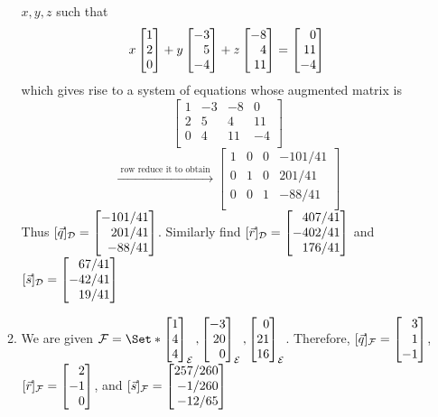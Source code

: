 \begin{exercises}
\begin{problist}
\begin{solution}
\begin{enumerate}
\begin{enumerate}
							$x, y, z$ such that \[ x \mat{1\\2\\0} + y \mat{-3\\5\\-4} +z 
							\mat{-8\\4\\11} = \mat{0\\11\\-4}\] which 
							gives rise to a system of equations whose augmented matrix is 
							\[
							\left[
							\begin{array}{ccc|c}
								1 & -3 & -8 & 0  \\
								2 & 5 & 4 & 11 \\
								0 & 4 & 11 & -4 \\
							\end{array}
							\right]\]\[ \xrightarrow{\text{ row reduce it to obtain }}
							\left[
							\begin{array}{ccc|c}
								1 & 0 & 0 & -101/41  \\
								0 & 1 & 0 & 201/41 \\
								0 & 0 & 1 & -88/41\\
							\end{array}
							\right]
							\]
							Thus $[\vec{q}]_{\mathcal{D}} = \mat{-101/41 \\ 201/41 \\ -88/41}$. Similarly find 
							$[\vec{r}]_{\mathcal{D}} = \mat{407/41 \\ -402/41 \\ 176/41}$ and $[\vec{s}]_{\mathcal{D}} = 
							\mat{67/41 \\ -42/41 \\ 19/41}$
						\item We are given $\mathcal{F} = \Set*{ \mat{1\\4\\4}_{\mathcal{E}}, \mat{-3\\20\\0}_{\mathcal{E}}, 
							\mat{0\\21\\16}_{\mathcal{E}}}$. Therefore,
							$[\vec{q}]_{\mathcal{F}} = \mat{3 \\ 1 \\ -1}$,
							$[\vec{r}]_{\mathcal{F}} = \mat{2 \\ -1 \\0}$,
							and $[\vec{s}]_{\mathcal{F}} = \mat{257/260 \\ -1/260 \\ -12/65}$
					\end{enumerate}
			\end{enumerate}
		\end{solution}


\end{problist}
\end{exercises}
